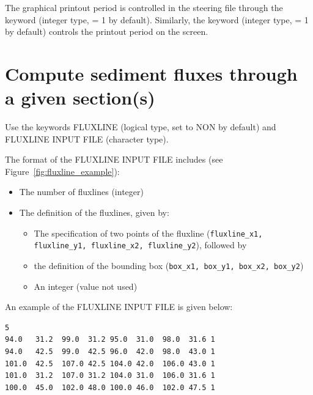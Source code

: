 {The graphical printout period is controlled in the  steering file through the keyword  (integer type, {\ttfamily = 1} by default).
Similarly, the keyword  (integer type, {\ttfamily = 1} by default) controls the printout period on the screen.

\section{Compute sediment fluxes through a given section(s)}
Use the keywords {\ttfamily FLUXLINE} (logical type, set to {\ttfamily NON} by default) and {\ttfamily FLUXLINE INPUT FILE} (character type).

The format of the {\ttfamily FLUXLINE INPUT FILE} includes (see Figure~\ref{fig:fluxline_example}):
\begin{itemize}
\item The number of fluxlines (integer)
\item The definition of the fluxlines, given by:
  \begin{itemize}
  \item The specification of two points of the fluxline (\texttt{fluxline\_x1, fluxline\_y1, fluxline\_x2, fluxline\_y2}), followed by
  \item the definition of the bounding box (\texttt{box\_x1, box\_y1, box\_x2, box\_y2})
  \item An integer (value not used)
  \end{itemize}
\end{itemize}

An example of the {\ttfamily FLUXLINE INPUT FILE} is given below:

\begin{lstlisting}[frame=trBL]
5
94.0   31.2  99.0  31.2 95.0  31.0  98.0  31.6 1
94.0   42.5  99.0  42.5 96.0  42.0  98.0  43.0 1
101.0  42.5  107.0 42.5 104.0 42.0  106.0 43.0 1
101.0  31.2  107.0 31.2 104.0 31.0  106.0 31.6 1
100.0  45.0  102.0 48.0 100.0 46.0  102.0 47.5 1
\end{lstlisting}

}
